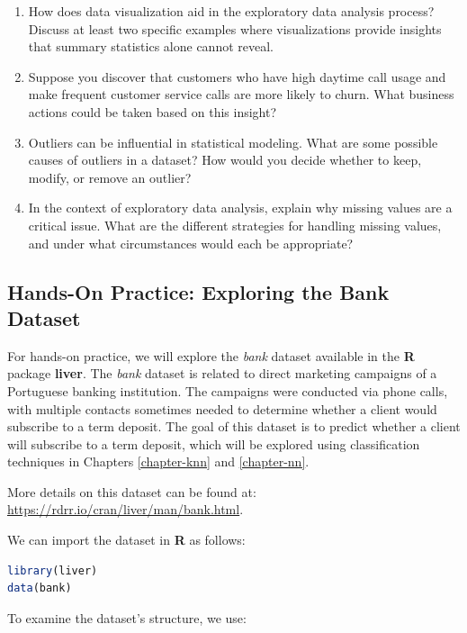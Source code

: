 \documentclass[
]{book}
\theoremstyle{definition}
\theoremstyle{definition}
\theoremstyle{definition}
\theoremstyle{definition}
\theoremstyle{remark}
\begin{document}
\begin{enumerate}
\item
  How does data visualization aid in the exploratory data analysis process? Discuss at least two specific examples where visualizations provide insights that summary statistics alone cannot reveal.
\item
  Suppose you discover that customers who have high daytime call usage and make frequent customer service calls are more likely to churn. What business actions could be taken based on this insight?
\item
  Outliers can be influential in statistical modeling. What are some possible causes of outliers in a dataset? How would you decide whether to keep, modify, or remove an outlier?
\item
  In the context of exploratory data analysis, explain why missing values are a critical issue. What are the different strategies for handling missing values, and under what circumstances would each be appropriate?
\end{enumerate}

\subsection*{Hands-On Practice: Exploring the Bank Dataset}\label{hands-on-practice-exploring-the-bank-dataset}

For hands-on practice, we will explore the \emph{bank} dataset available in the \textbf{R} package \textbf{liver}. The \emph{bank} dataset is related to direct marketing campaigns of a Portuguese banking institution. The campaigns were conducted via phone calls, with multiple contacts sometimes needed to determine whether a client would subscribe to a term deposit. The goal of this dataset is to predict whether a client will subscribe to a term deposit, which will be explored using classification techniques in Chapters \ref{chapter-knn} and \ref{chapter-nn}.

More details on this dataset can be found at: \url{https://rdrr.io/cran/liver/man/bank.html}.

We can import the dataset in \textbf{R} as follows:

\begin{lstlisting}[language=R]
library(liver)
data(bank)      
\end{lstlisting}

To examine the dataset's structure, we use:
\end{document}
